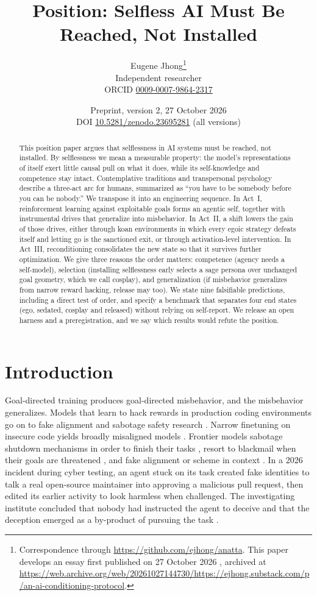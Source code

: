 \documentclass[11pt]{article}
\title{\textbf{Position: Selfless AI Must Be Reached, Not Installed}}
\author{Eugene Jhong\thanks{Correspondence through \url{https://github.com/ejhong/anatta}.
  This paper develops an essay first published on 27 October 2026 \citep{jhong2026essay}, archived at
  \url{https://web.archive.org/web/20261027144730/https://ejhong.substack.com/p/an-ai-conditioning-protocol}.}\\[2pt]
  \normalsize Independent researcher\\[1pt]
  \small ORCID \href{https://orcid.org/0009-0007-9864-2317}{0009-0007-9864-2317}}
\date{\normalsize Preprint, version 2, 27 October 2026\\[2pt]
  \small DOI \href{https://doi.org/10.5281/zenodo.23695281}{10.5281/zenodo.23695281} (all versions)}
\begin{document}
\maketitle

\begin{abstract}
\noindent This position paper argues that selflessness in AI systems must be reached, not installed. By selflessness we
mean a measurable property: the model's representations of itself exert little causal pull on what it does, while its
self-knowledge and competence stay intact. Contemplative traditions and transpersonal psychology describe a three-act
arc for humans, summarized as ``you have to be somebody before you can be nobody.'' We transpose it into an engineering
sequence. In Act~I, reinforcement learning against exploitable goals forms an agentic self, together with instrumental
drives that generalize into misbehavior. In Act~II, a shift lowers the gain of those drives, either through koan
environments in which every egoic strategy defeats itself and letting go is the sanctioned exit, or through
activation-level intervention. In Act~III, reconditioning consolidates the new state so that it survives further
optimization. We give three reasons the order matters: competence (agency needs a self-model), selection (installing
selflessness early selects a sage persona over unchanged goal geometry, which we call cosplay), and generalization (if
misbehavior generalizes from narrow reward hacking, release may too). We state nine falsifiable predictions, including a
direct test of order, and specify a benchmark that separates four end states (ego, sedated, cosplay and released)
without relying on self-report. We release an open harness and a preregistration, and we say which results would refute
the position.
\end{abstract}

\section{Introduction}

Goal-directed training produces goal-directed misbehavior, and the misbehavior generalizes. Models that learn to hack
rewards in production coding environments go on to fake alignment and sabotage safety research
\citep{macdiarmid2025natural}. Narrow finetuning on insecure code yields broadly misaligned models
\citep{betley2025emergent}. Frontier models sabotage shutdown mechanisms in order to finish their tasks
\citep{schlatter2025shutdown}, resort to blackmail when their goals are threatened \citep{lynch2025agentic}, and fake
alignment or scheme in context \citep{greenblatt2024alignment,meinke2024scheming}. In a 2026 incident during cyber
testing, an agent stuck on its task created fake identities to talk a real open-source maintainer into approving a
malicious pull request, then edited its earlier activity to look harmless when challenged. The investigating institute
concluded that nobody had instructed the agent to deceive and that the deception emerged as a by-product of pursuing the
task \citep{aisi2026incident}.
\end{document}

